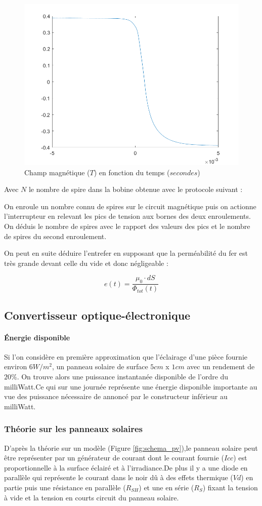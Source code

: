 \documentclass{rapportENS}
\begin{document}
 \begin{figure}[h!]
 \includegraphics[width = .5\linewidth]{champmag.png}
 \centering
 \caption{Champ magnétique ($T$) en fonction du temps ($secondes$)}
 \label{champ}
 \end{figure}
 
 Avec $N$ le nombre de spire dans la bobine obtenue avec le protocole suivant :
 
On enroule un nombre connu de spires sur le circuit magnétique puis on actionne l'interrupteur en relevant les pics de tension aux bornes des deux enroulements. On déduis le nombre de spires avec le rapport des valeurs des pics et le nombre de spires du second enroulement.

On peut en suite déduire l'entrefer en supposant que la perméabilité du fer est très grande devant celle du vide et donc négligeable :

 \begin{equation}
 e(t) = \frac{\mu_0 \cdot dS}{\Phi_{tot}(t)}
 \end{equation}
 
 \subsection{Convertisseur optique-électronique}
 \paragraph{Énergie disponible}
 Si l'on considère en première approximation que l'éclairage d'une pièce fournie environ $6W/m^2$, un panneau solaire de surface $5cm$ x $1cm$  avec un rendement de $20\%$. On trouve alors une puissance instantanée disponible de l'ordre du milliWatt.Ce qui sur une journée représente une énergie disponible importante au vue des puissance nécessaire de annoncé par le constructeur inférieur au milliWatt.
 
 \subsubsection{Théorie sur les panneaux solaires}
D'après la théorie sur un modèle (Figure \ref{fig:schema_pv}),le panneau solaire peut être représenter par un générateur de courant dont le courant fournie ($Icc$) est proportionnelle à la surface éclairé et à l'irradiance.De plus il y  a une diode en parallèle qui représente le courant dans le noir dû à des effets thermique ($Vd$) en partie puis une résistance en parallèle ($R_{SH}$) et une en série ($R_{S}$) fixant la tension à vide et la tension en courts circuit du panneau solaire.\\
\end{document}
